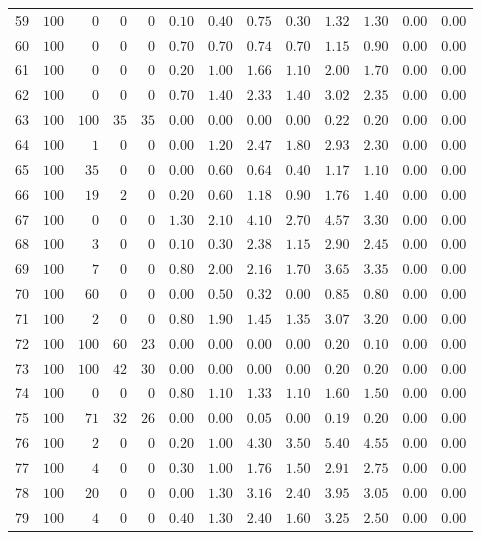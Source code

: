 \documentclass{article}
\begin{document}
\begin{landscape}
\begin{longtable}{lrrrrrrrrrrrr}
59&$100$&$  0$&$  0$&$  0$&$0.10$&$0.40$&$0.75$&$0.30$&$1.32$&$1.30$&$0.00$&$0.00$\\
60&$100$&$  0$&$  0$&$  0$&$0.70$&$0.70$&$0.74$&$0.70$&$1.15$&$0.90$&$0.00$&$0.00$\\
61&$100$&$  0$&$  0$&$  0$&$0.20$&$1.00$&$1.66$&$1.10$&$2.00$&$1.70$&$0.00$&$0.00$\\
62&$100$&$  0$&$  0$&$  0$&$0.70$&$1.40$&$2.33$&$1.40$&$3.02$&$2.35$&$0.00$&$0.00$\\
63&$100$&$100$&$ 35$&$ 35$&$0.00$&$0.00$&$0.00$&$0.00$&$0.22$&$0.20$&$0.00$&$0.00$\\
64&$100$&$  1$&$  0$&$  0$&$0.00$&$1.20$&$2.47$&$1.80$&$2.93$&$2.30$&$0.00$&$0.00$\\
65&$100$&$ 35$&$  0$&$  0$&$0.00$&$0.60$&$0.64$&$0.40$&$1.17$&$1.10$&$0.00$&$0.00$\\
66&$100$&$ 19$&$  2$&$  0$&$0.20$&$0.60$&$1.18$&$0.90$&$1.76$&$1.40$&$0.00$&$0.00$\\
67&$100$&$  0$&$  0$&$  0$&$1.30$&$2.10$&$4.10$&$2.70$&$4.57$&$3.30$&$0.00$&$0.00$\\
68&$100$&$  3$&$  0$&$  0$&$0.10$&$0.30$&$2.38$&$1.15$&$2.90$&$2.45$&$0.00$&$0.00$\\
69&$100$&$  7$&$  0$&$  0$&$0.80$&$2.00$&$2.16$&$1.70$&$3.65$&$3.35$&$0.00$&$0.00$\\
70&$100$&$ 60$&$  0$&$  0$&$0.00$&$0.50$&$0.32$&$0.00$&$0.85$&$0.80$&$0.00$&$0.00$\\
71&$100$&$  2$&$  0$&$  0$&$0.80$&$1.90$&$1.45$&$1.35$&$3.07$&$3.20$&$0.00$&$0.00$\\
72&$100$&$100$&$ 60$&$ 23$&$0.00$&$0.00$&$0.00$&$0.00$&$0.20$&$0.10$&$0.00$&$0.00$\\
73&$100$&$100$&$ 42$&$ 30$&$0.00$&$0.00$&$0.00$&$0.00$&$0.20$&$0.20$&$0.00$&$0.00$\\
74&$100$&$  0$&$  0$&$  0$&$0.80$&$1.10$&$1.33$&$1.10$&$1.60$&$1.50$&$0.00$&$0.00$\\
75&$100$&$ 71$&$ 32$&$ 26$&$0.00$&$0.00$&$0.05$&$0.00$&$0.19$&$0.20$&$0.00$&$0.00$\\
76&$100$&$  2$&$  0$&$  0$&$0.20$&$1.00$&$4.30$&$3.50$&$5.40$&$4.55$&$0.00$&$0.00$\\
77&$100$&$  4$&$  0$&$  0$&$0.30$&$1.00$&$1.76$&$1.50$&$2.91$&$2.75$&$0.00$&$0.00$\\
78&$100$&$ 20$&$  0$&$  0$&$0.00$&$1.30$&$3.16$&$2.40$&$3.95$&$3.05$&$0.00$&$0.00$\\
79&$100$&$  4$&$  0$&$  0$&$0.40$&$1.30$&$2.40$&$1.60$&$3.25$&$2.50$&$0.00$&$0.00$\\

\end{longtable}
\end{landscape}
\end{document}
